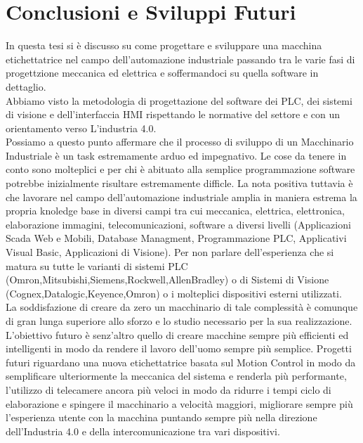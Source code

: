 \documentclass[12pt, a4paper, oneside]{book}
\begin{document}
\chapter{Conclusioni e Sviluppi Futuri}
In questa tesi si è discusso su come progettare e sviluppare una macchina etichettatrice nel campo dell'automazione industriale passando tra le varie fasi di progettzione meccanica ed elettrica e soffermandoci su quella software in dettaglio. 
\\Abbiamo visto la metodologia di progettazione del software dei PLC, dei sistemi di visione e dell'interfaccia HMI rispettando le normative del settore e con un orientamento verso L'industria 4.0. 
\\Possiamo a questo punto affermare che il processo di sviluppo di un Macchinario Industriale è un task estremamente arduo ed impegnativo. Le cose da tenere in conto sono molteplici e per chi è abituato alla semplice programmazione software potrebbe inizialmente risultare estremamente difficle. La nota positiva tuttavia è che lavorare nel campo dell'automazione industriale amplia in maniera estrema la propria knoledge base in diversi campi tra cui meccanica, elettrica, elettronica, elaborazione immagini, telecomunicazioni, software a diversi livelli (Applicazioni Scada Web e Mobili, Database Managment, Programmazione PLC, Applicativi Visual Basic, Applicazioni di Visione). Per non parlare dell'esperienza che si matura su tutte le varianti di sistemi PLC (Omron,Mitsubishi,Siemens,Rockwell,AllenBradley) o di Sistemi di Visione (Cognex,Datalogic,Keyence,Omron) o i molteplici dispositivi esterni utilizzati.
\\La soddisfazione di creare da zero un macchinario di tale complessità è comunque di gran lunga superiore allo sforzo e lo studio necessario per la sua realizzazione.
\\L'obiettivo futuro è senz'altro quello di creare macchine sempre più efficienti ed intelligenti in modo da rendere il lavoro dell'uomo sempre più semplice. Progetti futuri riguardano una nuova etichettatrice basata sul Motion Control in modo da semplificare ulteriormente la meccanica del sistema e renderla più performante, l'utilizzo di telecamere ancora più veloci in modo da ridurre i tempi ciclo di elaborazione e spingere il macchinario a velocità maggiori, migliorare sempre più l'esperienza utente con la macchina puntando sempre più nella direzione dell'Industria 4.0 e della intercomunicazione tra vari dispositivi.
\end{document}
